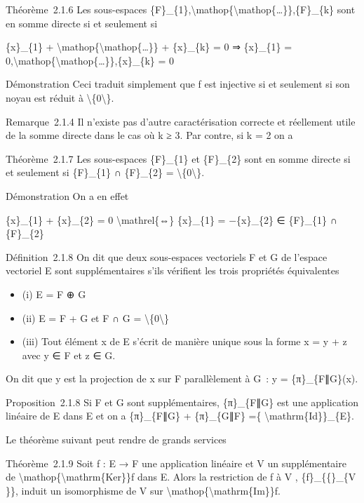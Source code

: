 \documentclass[]{article}
\begin{document}
Théorème~2.1.6 Les sous-espaces
\{F\}\_\{1\},\textbackslash{}mathop\{\textbackslash{}mathop\{\ldots{}\}\},\{F\}\_\{k\}
sont en somme directe si et seulement si

\{x\}\_\{1\} +
\textbackslash{}mathop\{\textbackslash{}mathop\{\ldots{}\}\} +
\{x\}\_\{k\} = 0 ⇒ \{x\}\_\{1\} =
0,\textbackslash{}mathop\{\textbackslash{}mathop\{\ldots{}\}\},\{x\}\_\{k\}
= 0

Démonstration Ceci traduit simplement que f est injective si et
seulement si son noyau est réduit à
\textbackslash{}\{0\textbackslash{}\}.

Remarque~2.1.4 Il n'existe pas d'autre caractérisation correcte et
réellement utile de la somme directe dans le cas où k ≥ 3. Par contre,
si k = 2 on a

Théorème~2.1.7 Les sous-espaces \{F\}\_\{1\} et \{F\}\_\{2\} sont en
somme directe si et seulement si \{F\}\_\{1\} ∩ \{F\}\_\{2\} =
\textbackslash{}\{0\textbackslash{}\}.

Démonstration On a en effet

\{x\}\_\{1\} + \{x\}\_\{2\} = 0 \textbackslash{}mathrel\{⇔\}
\{x\}\_\{1\} = −\{x\}\_\{2\} ∈ \{F\}\_\{1\} ∩ \{F\}\_\{2\}

Définition~2.1.8 On dit que deux sous-espaces vectoriels F et G de
l'espace vectoriel E sont supplémentaires s'ils vérifient les trois
propriétés équivalentes

\begin{itemize}
\itemsep1pt\parskip0pt
\item
  (i) E = F ⊕ G
\item
  (ii) E = F + G et F ∩ G = \textbackslash{}\{0\textbackslash{}\}
\item
  (iii) Tout élément x de E s'écrit de manière unique sous la forme x =
  y + z avec y ∈ F et z ∈ G.
\end{itemize}

On dit que y est la projection de x sur F parallèlement à G~: y =
\{π\}\_\{F∥G\}(x).

Proposition~2.1.8 Si F et G sont supplémentaires, \{π\}\_\{F∥G\} est une
application linéaire de E dans E et on a \{π\}\_\{F∥G\} + \{π\}\_\{G∥F\}
=\{ \textbackslash{}mathrm\{Id\}\}\_\{E\}.

Le théorème suivant peut rendre de grands services

Théorème~2.1.9 Soit f : E → F une application linéaire et V un
supplémentaire de
\textbackslash{}mathop\{\textbackslash{}mathrm\{Ker\}\}f dans E. Alors
la restriction de f à V , \{f\}\_\{\{\textbar{}\}\_\{V \}\}, induit un
isomorphisme de V sur
\textbackslash{}mathop\{\textbackslash{}mathrm\{Im\}\}f.
\end{document}
